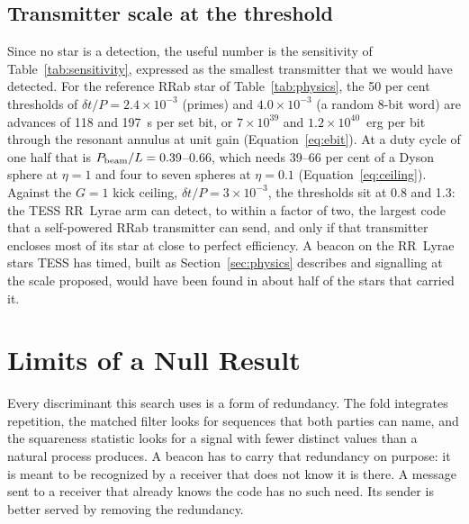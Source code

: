 \documentclass[final,5p]{elsarticle}
\newcommand{\dtp}{\ensuremath{\delta t/P}}
\newcommand{\pbeam}{\ensuremath{P_{\rm beam}}}
\begin{document}
\subsection{Transmitter scale at the threshold}
\label{sec:needed}

Since no star is a detection, the useful number is the sensitivity of Table~\ref{tab:sensitivity}, expressed as the smallest transmitter that we would have detected. For the reference RRab star of Table~\ref{tab:physics}, the 50 per cent thresholds of $\dtp=2.4\times10^{-3}$ (primes) and $4.0\times10^{-3}$ (a random 8-bit word) are advances of 118 and 197~s per set bit, or $7\times10^{39}$ and $1.2\times10^{40}$~erg per bit through the resonant annulus at unit gain (Equation~\ref{eq:ebit}). At a duty cycle of one half that is $\pbeam/L=0.39$--$0.66$, which needs 39--66 per cent of a Dyson sphere at $\eta=1$ and four to seven spheres at $\eta=0.1$ (Equation~\ref{eq:ceiling}). Against the $G=1$ kick ceiling, $\dtp=3\times10^{-3}$, the thresholds sit at 0.8 and 1.3: the TESS RR~Lyrae arm can detect, to within a factor of two, the largest code that a self-powered RRab transmitter can send, and only if that transmitter encloses most of its star at close to perfect efficiency. A beacon on the RR~Lyrae stars TESS has timed, built as Section~\ref{sec:physics} describes and signalling at the scale \citet{Learned2008} proposed, would have been found in about half of the stars that carried it.

\section{Limits of a Null Result}
\label{sec:compression}

Every discriminant this search uses is a form of redundancy. The fold integrates repetition, the matched filter looks for sequences that both parties can name, and the squareness statistic looks for a signal with fewer distinct values than a natural process produces. A beacon has to carry that redundancy on purpose: it is meant to be recognized by a receiver that does not know it is there. A message sent to a receiver that already knows the code has no such need. Its sender is better served by removing the redundancy.
\end{document}
